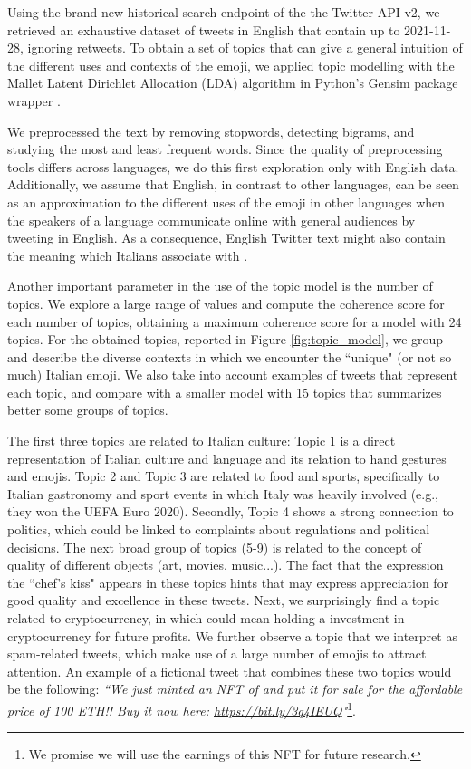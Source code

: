 \documentclass{article}
\begin{document}
Using the brand new historical search endpoint of the the Twitter API v2, we retrieved an exhaustive dataset of tweets in English that contain  up to 2021-11-28, ignoring retweets. To obtain a set of topics that can give a general intuition of the different uses and contexts of the emoji, we applied topic modelling with the Mallet Latent Dirichlet Allocation (LDA) algorithm in Python's Gensim package wrapper \cite{McCallumMALLET}. 

We preprocessed the text by removing stopwords, detecting bigrams, and studying the most and least frequent words. Since the quality of preprocessing tools differs across languages, we do this first exploration only with English data. Additionally, we assume that English, in contrast to other languages, can be seen as an approximation to the different uses of the emoji in other languages when the speakers of a language communicate online with general audiences by tweeting in English. As a consequence, English Twitter text might also contain the meaning which Italians associate with . 

Another important parameter in the use of the topic model is the number of topics. We explore a large range of values and compute the coherence score for each number of topics, obtaining a maximum coherence score for a model with 24 topics. For the obtained topics, reported in Figure \ref{fig:topic_model}, we group and describe the diverse contexts in which we encounter the ``unique" (or not so much) Italian emoji. We also take into account examples of tweets that represent each topic, and compare with a smaller model with 15 topics that summarizes better some groups of topics.

The first three topics are related to Italian culture: Topic 1 is a direct representation of Italian culture and language and its relation to hand gestures and emojis. Topic 2 and Topic 3 are related to food and sports, specifically to Italian gastronomy and sport events in which Italy was heavily involved (e.g., they won the UEFA Euro 2020). Secondly, Topic 4 shows a strong connection to politics, which could be linked to complaints about regulations and political decisions. The next broad group of topics (5-9) is related to the concept of quality of different objects (art, movies, music...). The fact that the expression the ``chef's kiss" appears in these topics hints that  may express appreciation for good quality and excellence in these tweets. Next, we surprisingly find a topic related to cryptocurrency, in which  could mean holding a investment in cryptocurrency for future profits. We further observe a topic that we interpret as spam-related tweets, which make use of a large number of emojis to attract attention. An example of a fictional tweet that combines these two topics would be the following: \emph{``We just minted an NFT of  and put it for sale for the affordable price of 100 ETH!! Buy it now here: \url{https://bit.ly/3q4IEUQ}"}\footnote{We promise we will use the earnings of this NFT for future research.}.
    
\end{document}
